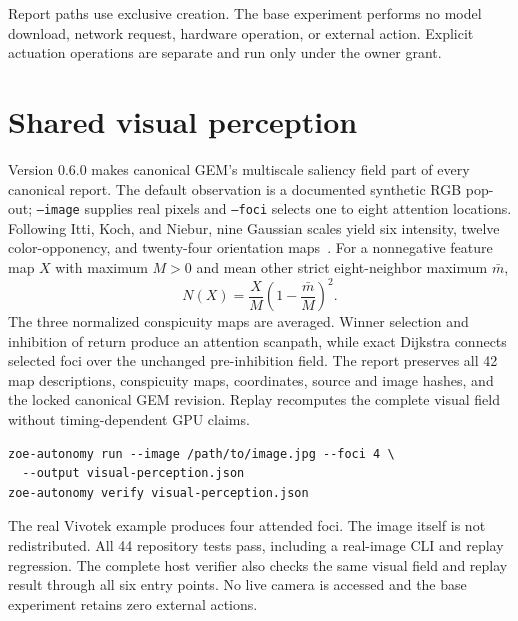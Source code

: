 \documentclass[11pt,a4paper]{article}
\begin{document}
Report paths use exclusive creation. The base experiment performs no model download, network request, hardware operation, or external action. Explicit actuation operations are separate and run only under the owner grant.

\section{Shared visual perception}
Version 0.6.0 makes canonical GEM's multiscale saliency field part of every canonical report. The default observation is a documented synthetic RGB pop-out; \texttt{--image} supplies real pixels and \texttt{--foci} selects one to eight attention locations. Following Itti, Koch, and Niebur, nine Gaussian scales yield six intensity, twelve color-opponency, and twenty-four orientation maps~\cite{itti1998}. For a nonnegative feature map $X$ with maximum $M>0$ and mean other strict eight-neighbor maximum $\bar m$,
\begin{equation}
N(X)=\frac{X}{M}\left(1-\frac{\bar m}{M}\right)^2.
\end{equation}
The three normalized conspicuity maps are averaged. Winner selection and inhibition of return produce an attention scanpath, while exact Dijkstra connects selected foci over the unchanged pre-inhibition field. The report preserves all 42 map descriptions, conspicuity maps, coordinates, source and image hashes, and the locked canonical GEM revision. Replay recomputes the complete visual field without timing-dependent GPU claims.

\begin{lstlisting}
zoe-autonomy run --image /path/to/image.jpg --foci 4 \
  --output visual-perception.json
zoe-autonomy verify visual-perception.json
\end{lstlisting}

The real Vivotek example produces four attended foci. The image itself is not redistributed. All 44 repository tests pass, including a real-image CLI and replay regression. The complete host verifier also checks the same visual field and replay result through all six entry points. No live camera is accessed and the base experiment retains zero external actions.

\end{document}
